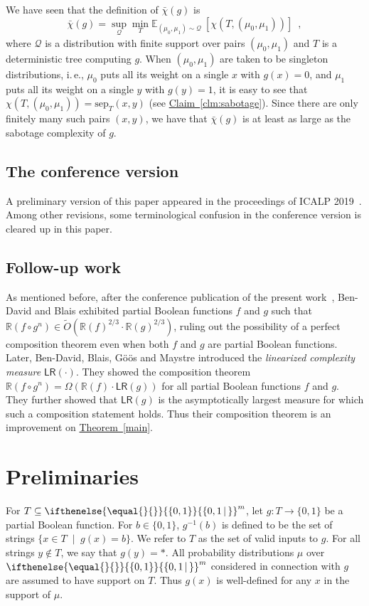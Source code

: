\documentclass[11pt]{article}
\numberwithin{equation}{section}
\theoremstyle{definition}
\theoremstyle{plain}
\newcommand{\R}{\mathbb R}
\newcommand{\ie}{i.\,e.}
\newcommand{\expref}[2]{\hyperref[#2]{#1~\ref{#2}}}
\newcommand{\md}{\middle}
\newcommand{\set}[2][]{\ifthenelse{\equal{}{#1}}%
{\ensuremath{\left\{#2\right\}}}%
{\ensuremath{\left\{#2\,\md|\,#1\right\}}}}
\newcommand{\OI}{\set{0,1}}
\newcommand{\e}{\emph}
\newcommand{\clQ}{\mathcal{Q}}
\newcommand{\sep}{\mathrm{sep}}
\newcommand{\E}{\mathbb{E}}
\begin{document}
We have seen that the definition of $\bar \chi(g)$ is 
\[
\bar \chi(g) = \sup_{\clQ} \min_{T} \E_{(\mu_0, \mu_1) \sim \clQ}\ [ \chi(T, (\mu_0, \mu_1))] \enspace ,
\]
where $\clQ$ is a distribution with finite support over pairs $(\mu_0, \mu_1)$ and $T$ is a deterministic tree computing $g$.  When $(\mu_0, \mu_1)$ are taken to be singleton distributions, 
\ie, $\mu_0$ puts all its weight on a single $x$ with $g(x)=0$, and $\mu_1$ puts all its weight on a single $y$ with $g(y)=1$, it is easy to see that $\chi(T, (\mu_0, \mu_1)) = \sep_T(x,y)$ 
(see \expref{Claim}{clm:sabotage}).  Since there are only finitely many such pairs $(x, y)$, we have that $\bar \chi(g)$ is at least as large as the sabotage complexity of $g$.
%
\subsection{The conference version}
A preliminary version of this paper
appeared in the proceedings of ICALP 2019~\cite{conf-version}. Among other revisions, some terminological confusion in the conference version is cleared up in this paper.
%
\subsection{Follow-up work}
As mentioned before, after the conference publication of the
%
present work~\cite{conf-version},  %
Ben-David and Blais \cite{DBLP:journals/corr/abs-2002-10809} %
exhibited partial Boolean functions $f$ and $g$ such that $\R(f \circ g^n) \in \widetilde{O}(\R(f)^{2/3}\cdot \R(g)^{2/3})$, ruling out the possibility of a perfect composition theorem even when both $f$ and $g$ are partial Boolean functions. Later, Ben-David, Blais, G{\"o}{\"o}s and Maystre \cite{ben2022randomised} introduced the \e{linearized complexity measure} $\mathsf{LR}(\cdot)$. They showed the composition theorem $\R(f \circ g^n)=\Omega(\R(f)\cdot\mathsf{LR}(g))$ for all partial Boolean functions $f$ and $g$. They further showed that $\mathsf{LR}(g)$ is the asymptotically largest measure for which such a composition statement holds. Thus their composition theorem is an improvement on
\expref{Theorem}{main}.  %

\section{Preliminaries}
\label{prelims}
%
For $T \subseteq \OI^m$, let $g: T \to \{0,1\}$ be a partial Boolean function. For $b \in \{0,1\}$, $g^{-1}(b)$ is defined to be the set of strings $\{x \in T\;\mid\;g(x)=b\}$. We refer to $T$ as the set of valid inputs to $g$. For all strings $y \notin T$, we say that $g(y)=*$. All probability distributions $\mu$ over $\OI^m$ considered in connection with $g$ are assumed to have support on $T$. Thus $g(x)$ is well-defined for any $x$ in the support of $\mu$.
\end{document}
